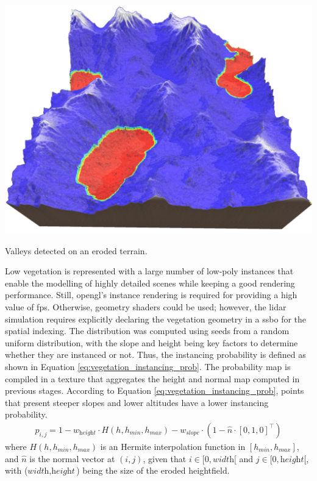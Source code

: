 \begin{marginfigure}[1.0cm]
    \centering
    \includegraphics[width=\linewidth]{figs/lidar_simulation/valley_finds.png}
	\caption{Valleys detected on an eroded terrain. }
	\label{fig:terrain_valleys}
\end{marginfigure}
Low vegetation is represented with a large number of low-poly instances that enable the modelling of highly detailed scenes while keeping a good rendering performance. Still, \acrshort{opengl}'s instance rendering is required for providing a high value of \acrshort{fps}. Otherwise, geometry shaders could be used; however, the \acrshort{lidar} simulation requires explicitly declaring the vegetation geometry in a \acrshort{ssbo} for the spatial indexing. The distribution was computed using seeds from a random uniform distribution, with the slope and height being key factors to determine whether they are instanced or not. Thus, the instancing probability is defined as shown in Equation \ref{eq:vegetation_instancing_prob}. The probability map is compiled in a texture that aggregates the height and normal map computed in previous stages. According to Equation \ref{eq:vegetation_instancing_prob}, points that present steeper slopes and lower altitudes have a lower instancing probability.
\begin{gather}
    \label{eq:vegetation_instancing_prob}
    p_{i, j} = 1 - w_{\textit{height}} \cdot H(h, h_{\textit{min}}, h_{\textit{max}}) - w_{\textit{slope}} \cdot (1 - \hat{n} \cdot \left[0, 1, 0\right]^\intercal)
\end{gather}
where $H(h, h_{\textit{min}}, h_{\textit{max}})$ is an Hermite interpolation function in $[h_{\textit{min}}, h_{\textit{max}}]$, and $\hat{n}$ is the normal vector at $(i, j)$, given that $i \in [0, \textit{width}[$ and $j \in [0, \textit{height}[$, with ($\textit{width}, \textit{height}$) being the size of the eroded heightfield.

